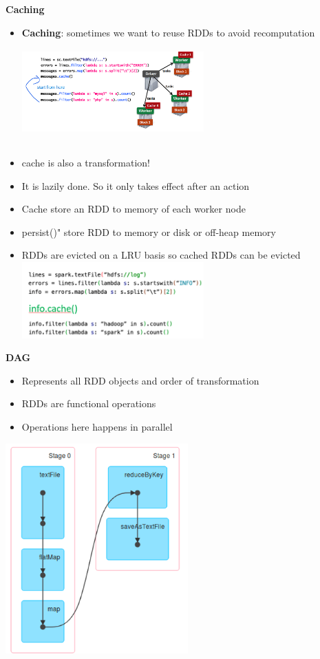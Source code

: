 \documentclass[10pt, landscape]{article}
\begin{document}
\begin{multicols}{4}
\textbf{Caching}
\begin{itemize}
  \item \textbf{Caching}: sometimes we want to reuse RDDs to avoid recomputation
  \includegraphics*[width=7cm, height=4cm]{rdd4}
  \item cache is also a transformation!
  \item It is lazily done. So it only takes effect after an action
  \item Cache store an RDD to memory of each worker node 
  \item persist()" store RDD to memory or disk or off-heap memory 
  \item RDDs are evicted on a LRU basis so cached RDDs can be evicted
  \includegraphics*[width=7cm]{caching.png}
\end{itemize}


\textbf{DAG}
\begin{itemize}
  \item Represents all RDD objects and order of transformation
  \item RDDs are functional operations
  \item Operations here happens in parallel
\end{itemize}
\includegraphics*[width=7cm]{dag}


\end{multicols}
\end{document}

